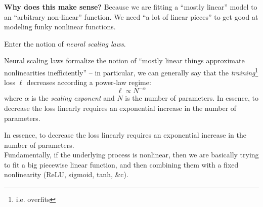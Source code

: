 \begin{frame}
    \textbf{Why does this make sense?} Because we are fitting a ``mostly linear'' model to an ``arbitrary
    non-linear'' function. We need ``a lot of linear pieces'' to get good at modeling funky nonlinear functions.


    Enter the notion of \textit{neural scaling laws}.
\end{frame}

\begin{frame}
    Neural scaling laws formalize the notion of ``mostly linear things approximate nonlinearities inefficiently'' --
    in particular, we can generally say that the \textit{training}\footnote{
        i.e. overfits
    } loss $\ell$ decreases according a power-law regime:
    \[
        \ell \propto N^{-\alpha}
    \]
    where $\alpha$ is the \textit{scaling exponent} and $N$ is the number of parameters. In essence,
    to decrease the loss linearly requires an exponential increase in the number of parameters.
\end{frame}

\begin{frame}
    In essence, to decrease the loss linearly requires an exponential increase in the number of parameters. \\

    Fundamentally, if the underlying process is nonlinear, then we are basically trying to fit a big piecewise
    linear function, and then combining them with a fixed nonlinearity (ReLU, sigmoid, tanh, \&c).
\end{frame}

